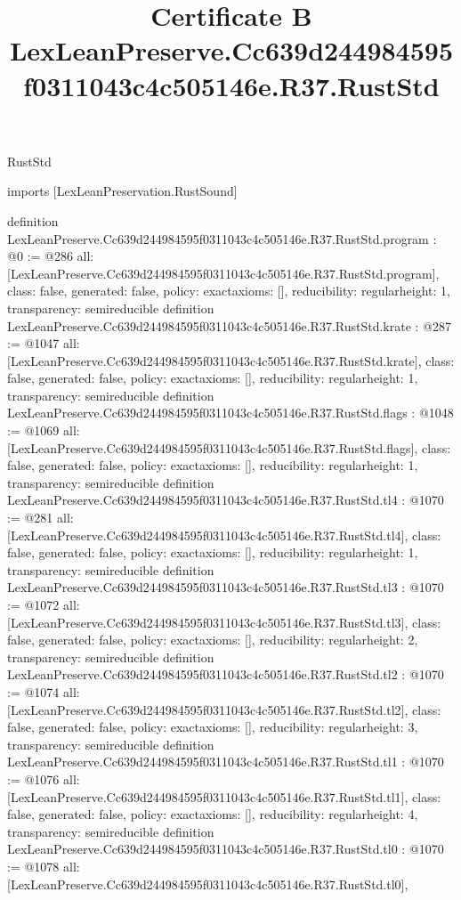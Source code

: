 \begin{lexlean}{RustStd}
\title{Certificate B LexLeanPreserve.Cc639d244984595f0311043c4c505146e.R37.RustStd}
\begin{coremodule}
imports [LexLeanPreservation.RustSound]

definition LexLeanPreserve.Cc639d244984595f0311043c4c505146e.R37.RustStd.program : @0 := @286 {
  all: [LexLeanPreserve.Cc639d244984595f0311043c4c505146e.R37.RustStd.program],
  class: false,
  generated: false,
  policy: exact{axioms: []},
  reducibility: regular{height: 1},
  transparency: semireducible
}
definition LexLeanPreserve.Cc639d244984595f0311043c4c505146e.R37.RustStd.krate : @287 := @1047 {
  all: [LexLeanPreserve.Cc639d244984595f0311043c4c505146e.R37.RustStd.krate],
  class: false,
  generated: false,
  policy: exact{axioms: []},
  reducibility: regular{height: 1},
  transparency: semireducible
}
definition LexLeanPreserve.Cc639d244984595f0311043c4c505146e.R37.RustStd.flags : @1048 := @1069 {
  all: [LexLeanPreserve.Cc639d244984595f0311043c4c505146e.R37.RustStd.flags],
  class: false,
  generated: false,
  policy: exact{axioms: []},
  reducibility: regular{height: 1},
  transparency: semireducible
}
definition LexLeanPreserve.Cc639d244984595f0311043c4c505146e.R37.RustStd.tl4 : @1070 := @281 {
  all: [LexLeanPreserve.Cc639d244984595f0311043c4c505146e.R37.RustStd.tl4],
  class: false,
  generated: false,
  policy: exact{axioms: []},
  reducibility: regular{height: 1},
  transparency: semireducible
}
definition LexLeanPreserve.Cc639d244984595f0311043c4c505146e.R37.RustStd.tl3 : @1070 := @1072 {
  all: [LexLeanPreserve.Cc639d244984595f0311043c4c505146e.R37.RustStd.tl3],
  class: false,
  generated: false,
  policy: exact{axioms: []},
  reducibility: regular{height: 2},
  transparency: semireducible
}
definition LexLeanPreserve.Cc639d244984595f0311043c4c505146e.R37.RustStd.tl2 : @1070 := @1074 {
  all: [LexLeanPreserve.Cc639d244984595f0311043c4c505146e.R37.RustStd.tl2],
  class: false,
  generated: false,
  policy: exact{axioms: []},
  reducibility: regular{height: 3},
  transparency: semireducible
}
definition LexLeanPreserve.Cc639d244984595f0311043c4c505146e.R37.RustStd.tl1 : @1070 := @1076 {
  all: [LexLeanPreserve.Cc639d244984595f0311043c4c505146e.R37.RustStd.tl1],
  class: false,
  generated: false,
  policy: exact{axioms: []},
  reducibility: regular{height: 4},
  transparency: semireducible
}
definition LexLeanPreserve.Cc639d244984595f0311043c4c505146e.R37.RustStd.tl0 : @1070 := @1078 {
  all: [LexLeanPreserve.Cc639d244984595f0311043c4c505146e.R37.RustStd.tl0],
}
\end{coremodule}
\end{lexlean}
